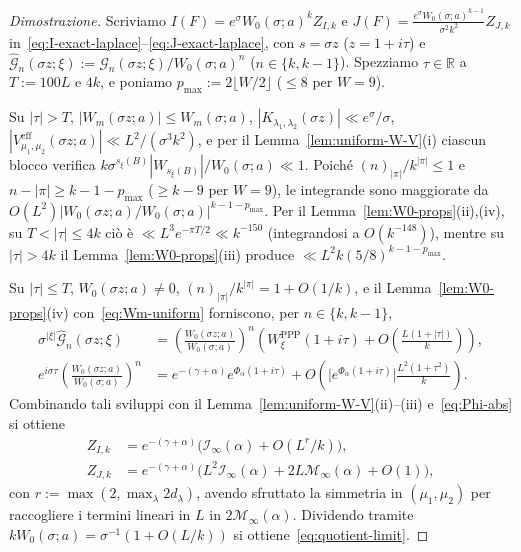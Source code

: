 \documentclass[11pt, reqno]{amsart}
\theoremstyle{remark}
\numberwithin{equation}{section}
\newcommand{\R}{\mathbb{R}}
\newcommand{\cG}{\mathcal{G}}
\begin{document}
\begin{proof}[Dimostrazione]
Scriviamo $I(F) = e^\sigma W_0(\sigma; a)^k Z_{I,k}$ e $J(F) = \frac{e^\sigma W_0(\sigma; a)^{k-1}}{\sigma^2 k^2} Z_{J,k}$
in~\eqref{eq:I-exact-laplace}--\eqref{eq:J-exact-laplace}, con $s = \sigma z$ ($z = 1+i\tau$) e
$\widehat{\cG}_n(\sigma z;\xi) := \cG_n(\sigma z;\xi)/W_0(\sigma;a)^n$ ($n \in \{k, k-1\}$). Spezziamo
$\tau \in \R$ a $T := 100 L$ e $4k$, e poniamo $p_{\max} := 2\lfloor W/2\rfloor$ ($\le 8$ per $W=9$).

Su $|\tau| > T$, $|W_m(\sigma z; a)| \le W_m(\sigma; a)$, $|K_{\lambda_1,\lambda_2}(\sigma z)| \ll e^\sigma/\sigma$,
$|V_{\mu_1,\mu_2}^{\mathrm{eff}}(\sigma z; a)| \ll L^2/(\sigma^3 k^2)$, e per il Lemma~\ref{lem:uniform-W-V}(i)
ciascun blocco verifica $k\sigma^{s_\xi(B)}|W_{s_\xi(B)}|/W_0(\sigma;a) \ll 1$. Poiché $(n)_{|\pi|}/k^{|\pi|} \le 1$ e
$n - |\pi| \ge k - 1 - p_{\max}$ ($\ge k-9$ per $W=9$), le integrande sono maggiorate da
$O(L^2)|W_0(\sigma z;a)/W_0(\sigma;a)|^{k-1-p_{\max}}$. Per il Lemma~\ref{lem:W0-props}(ii),(iv), su
$T < |\tau| \le 4k$ ciò è $\ll L^3 e^{-\pi T/2} \ll k^{-150}$ (integrandosi a $O(k^{-148})$), mentre su
$|\tau| > 4k$ il Lemma~\ref{lem:W0-props}(iii) produce $\ll L^2 k (5/8)^{k-1-p_{\max}}$.

Su $|\tau| \le T$, $W_0(\sigma z;a) \neq 0$, $(n)_{|\pi|}/k^{|\pi|} = 1 + O(1/k)$, e il Lemma~\ref{lem:W0-props}(iv)
con~\eqref{eq:Wm-uniform} forniscono, per $n \in \{k, k-1\}$,
\begin{align*}
\sigma^{|\xi|}\widehat{\cG}_n(\sigma z;\xi)
&= \left(\frac{W_0(\sigma z;a)}{W_0(\sigma;a)}\right)^{\!n}
\left(W_\xi^{\mathrm{PPP}}(1+i\tau) + O\!\left(\frac{L(1+|\tau|)}{k}\right)\right), \\
e^{i\sigma\tau}\left(\frac{W_0(\sigma z;a)}{W_0(\sigma;a)}\right)^{\!n}
&= e^{-(\gamma+\alpha)} e^{\Phi_\alpha(1+i\tau)}
+ O\!\left(\bigl|e^{\Phi_\alpha(1+i\tau)}\bigr|\frac{L^2(1+\tau^2)}{k}\right).
\end{align*}
Combinando tali sviluppi con il Lemma~\ref{lem:uniform-W-V}(ii)--(iii) e~\eqref{eq:Phi-abs} si ottiene
\begin{align*}
Z_{I,k} &= e^{-(\gamma+\alpha)}\bigl(\mathcal{I}_\infty(\alpha) + O(L^r/k)\bigr), \\
Z_{J,k} &= e^{-(\gamma+\alpha)}\bigl(L^2\mathcal{I}_\infty(\alpha) + 2L\mathcal{M}_\infty(\alpha) + O(1)\bigr),
\end{align*}
con $r := \max(2, \max_\lambda 2d_\lambda)$, avendo sfruttato la simmetria in $(\mu_1,\mu_2)$ per
raccogliere i termini lineari in $L$ in $2\mathcal{M}_\infty(\alpha)$. Dividendo tramite
$k W_0(\sigma; a) = \sigma^{-1}(1 + O(L/k))$ si ottiene~\eqref{eq:quotient-limit}.
\end{proof}
\end{document}
